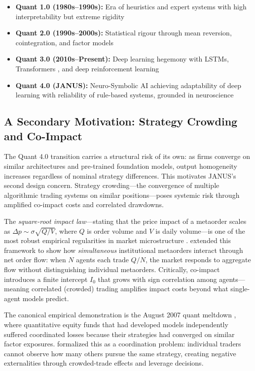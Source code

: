 \documentclass[12pt, a4paper]{article}
\begin{document}
\begin{itemize}
	\item \textbf{Quant 1.0 (1980s--1990s):} Era of heuristics and expert systems with high interpretability but extreme rigidity
	\item \textbf{Quant 2.0 (1990s--2000s):} Statistical rigour through mean reversion, cointegration, and factor models \citep{fama1993common}
	\item \textbf{Quant 3.0 (2010s--Present):} Deep learning hegemony with LSTMs, Transformers \citep{vaswani2017attention}, and deep reinforcement learning \citep{sutton2018reinforcement}
	\item \textbf{Quant 4.0 (JANUS):} Neuro-Symbolic AI achieving adaptability of deep learning with reliability of rule-based systems, grounded in neuroscience
\end{itemize}

\subsection{A Secondary Motivation: Strategy Crowding and Co-Impact}
\label{sec:crowding_motivation}

The Quant 4.0 transition carries a structural risk of its own: as firms converge on similar architectures and pre-trained foundation models, output homogeneity increases regardless of nominal strategy differences. This motivates JANUS's second design concern. Strategy crowding---the convergence of multiple algorithmic trading systems on similar positions---poses systemic risk through amplified co-impact costs and correlated drawdowns.

The \textit{square-root impact law}---stating that the price impact of a metaorder scales as $\Delta p \sim \sigma \sqrt{Q/V}$, where $Q$ is order volume and $V$ is daily volume---is one of the most robust empirical regularities in market microstructure \citep{toth2011anomalous, bouchaud2018trades, bucci2019crossover}. \citet{bucci2020coimpact} extended this framework to show how \textit{simultaneous} institutional metaorders interact through net order flow: when $N$ agents each trade $Q/N$, the market responds to aggregate flow without distinguishing individual metaorders. Critically, co-impact introduces a finite intercept $I_0$ that grows with sign correlation among agents---meaning correlated (crowded) trading amplifies impact costs beyond what single-agent models predict.

The canonical empirical demonstration is the August 2007 quant meltdown \citep{khandani2011quants}, where quantitative equity funds that had developed models independently suffered coordinated losses because their strategies had converged on similar factor exposures. \citet{stein2009crowding} formalized this as a coordination problem: individual traders cannot observe how many others pursue the same strategy, creating negative externalities through crowded-trade effects and leverage decisions.
\end{document}
